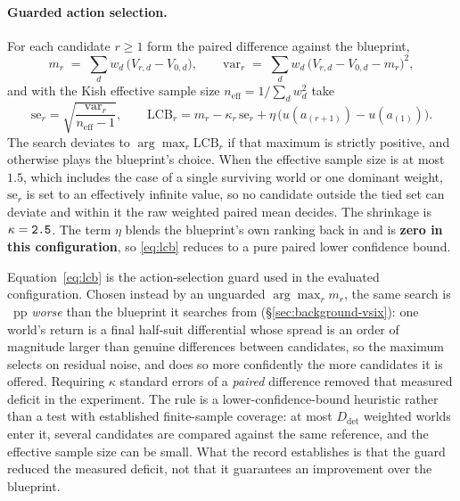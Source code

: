 \paragraph{Guarded action selection.} For each candidate $r \ge 1$ form the paired difference
against the blueprint,
\begin{equation}
  m_r \;=\; \sum_{d} w_d\,\bigl(V_{r,d} - V_{0,d}\bigr),
  \qquad
  \mathrm{var}_r \;=\; \sum_{d} w_d\,\bigl(V_{r,d} - V_{0,d} - m_r\bigr)^2,
  \label{eq:paired}
\end{equation}
and with the Kish effective sample size $n_{\mathrm{eff}} = 1/\sum_d w_d^2$ take
\begin{equation}
  \mathrm{se}_r = \sqrt{\frac{\mathrm{var}_r}{n_{\mathrm{eff}} - 1}},
  \qquad
  \mathrm{LCB}_r = m_r - \kappa_r\,\mathrm{se}_r + \eta\,\bigl(u(a_{(r+1)}) - u(a_{(1)})\bigr).
  \label{eq:lcb}
\end{equation}
The search deviates to $\arg\max_r \mathrm{LCB}_r$ if that maximum is strictly positive, and
otherwise plays the blueprint's choice. When the effective sample size is at most $1.5$, which
includes the case of a single surviving world or one dominant weight, $\mathrm{se}_r$ is set to an
effectively infinite value, so no candidate outside the tied set can deviate and within it the raw
weighted paired mean decides. The shrinkage is $\kappa = \texttt{2.5{}}$. The term $\eta$ blends the blueprint's own
ranking back in and is \textbf{zero in this configuration}, so \eqref{eq:lcb} reduces to a pure
paired lower confidence bound.

Equation~\eqref{eq:lcb} is the action-selection guard used in the evaluated configuration. Chosen
instead by an unguarded $\arg\max_r m_r$, the same search is \vsixCurseGap{}~pp \emph{worse} than
the blueprint it searches from (\S\ref{sec:background-vsix}): one world's return is a final
half-suit differential whose spread is an order of magnitude larger than genuine differences between
candidates, so the maximum selects on residual noise, and does so more confidently the more
candidates it is offered. Requiring $\kappa$ standard errors of a \emph{paired} difference removed
that measured deficit in the \vsix{} experiment. The rule is a lower-confidence-bound heuristic
rather than a test with established finite-sample coverage: at most $D_{\mathrm{det}}$ weighted
worlds enter it, several candidates are compared against the same reference, and the effective
sample size can be small. What the record establishes is that the guard reduced the measured
deficit, not that it guarantees an improvement over the blueprint.


